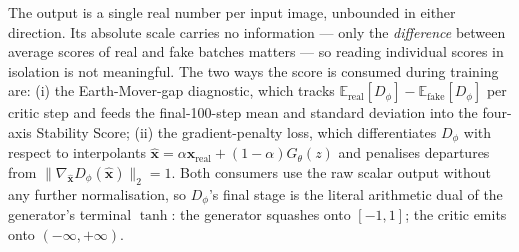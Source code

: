 
The output is a single real number per input image, unbounded in
either direction. Its absolute scale carries no information --- only
the \emph{difference} between average scores of real and fake batches
matters --- so reading individual scores in isolation is not
meaningful. The two ways the score is consumed during training are: (i)
the Earth-Mover-gap diagnostic, which tracks
$\mathbb{E}_{\text{real}}[D_\phi] - \mathbb{E}_{\text{fake}}[D_\phi]$
per critic step and feeds the final-100-step mean and standard
deviation into the four-axis Stability Score; (ii) the gradient-penalty
loss, which differentiates $D_\phi$ with respect to interpolants
$\hat{\mathbf{x}} = \alpha \mathbf{x}_{\mathrm{real}} + (1 - \alpha)
G_\theta(z)$ and penalises departures from $\|\nabla_{\hat{\mathbf{x}}}
D_\phi(\hat{\mathbf{x}})\|_2 = 1$. Both consumers use the raw scalar
output without any further normalisation, so $D_\phi$'s final stage is
the literal arithmetic dual of the generator's terminal $\tanh$: the
generator squashes onto $[-1, 1]$; the critic emits onto $(-\infty,
+\infty)$.
